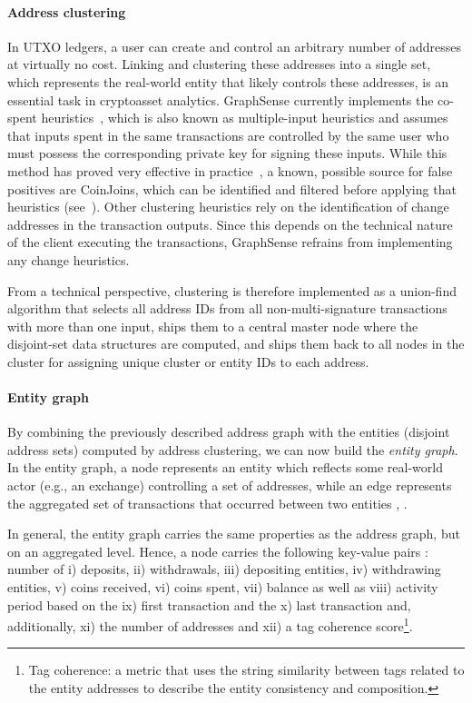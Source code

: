 \paragraph{Address clustering} In UTXO ledgers, a user can create and control an arbitrary number of addresses at virtually no cost. Linking and clustering these addresses into a single set, which represents the real-world entity that likely controls these addresses, is an essential task in cryptoasset analytics. GraphSense currently implements the co-spent heuristics~\cite{Meiklejohn:2013aa}, which is also known as multiple-input heuristics and assumes that inputs spent in the same transactions are controlled by the same user who must possess the corresponding private key for signing these inputs. While this method has proved very effective in practice~\cite{Harrigan:2016a}, a known, possible source for false positives are CoinJoins, which can be identified and filtered before applying that heuristics (see~\cite{Kalodner:2020a}). Other clustering heuristics rely on the identification of change addresses in the transaction outputs. Since this depends on the technical nature of the client executing the transactions, GraphSense refrains from implementing any change heuristics.

From a technical perspective, clustering is therefore implemented as a union-find algorithm that selects all address IDs from all non-multi-signature transactions with more than one input, ships them to a central master node where the disjoint-set data structures are computed, and ships them back to all nodes in the cluster for assigning unique cluster or entity IDs to each address.

\paragraph{Entity graph} By combining the previously described address graph with the entities (disjoint address sets) computed by address clustering, we can now build the \emph{entity graph}. In the entity graph, a node represents an entity  which reflects some real-world actor (e.g., an exchange) controlling a set of addresses, while an edge represents the aggregated set of transactions  that occurred between two entities , .

In general, the entity graph carries the same properties as the address graph, but on an aggregated level. Hence, a node  carries the following key-value pairs : number of i) deposits, ii) withdrawals, iii) depositing entities, iv) withdrawing entities, v) coins received, vi) coins spent, vii) balance as well as viii) activity period based on the ix) first transaction and the x) last transaction and, additionally, xi) the number of addresses and xii) a tag coherence score\footnote{Tag coherence: a metric that uses the string similarity between tags related to the entity addresses to describe the entity consistency and composition.}.

